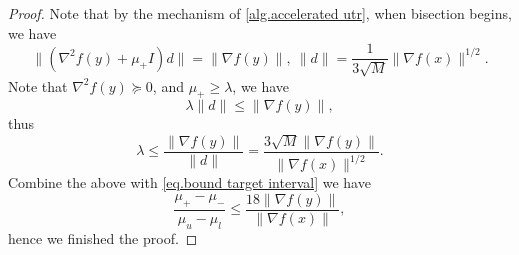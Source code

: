\documentclass{article}
\begin{document}
\begin{proof}
    Note that by the mechanism of \autoref{alg.accelerated utr}, when bisection begins, we have
    \begin{equation*}
        \|\left (\nabla^2 f(y)+\mu_+ I \right)d\| =\|\nabla f(y)\|, \ \|d\| =\frac{1}{3\sqrt{M}}\|\nabla f(x)\|^{1/2}.
    \end{equation*}
    Note that $\nabla ^2 f(y)\succeq 0$, and $\mu_+ \geq \lambda$, we have
    \begin{equation*}
        \lambda\|d\| \leq \|\nabla f(y)\|,
    \end{equation*}
    thus 
    \begin{equation*}
        \lambda \leq \frac{\|\nabla f(y)\|}{\|d\|} = \frac{3\sqrt{M}\|\nabla f(y)\|}{\|\nabla f(x)\|^{1/2}}.
    \end{equation*}
    Combine the above with \eqref{eq.bound target interval} we have
    \begin{equation*}
        \frac{\mu_+-\mu_-}{\mu_u-\mu_l} \leq \frac{18\|\nabla f(y)\|}{\|\nabla f(x)\|},
    \end{equation*}
    hence we finished the proof.
\end{proof}
\end{document}
